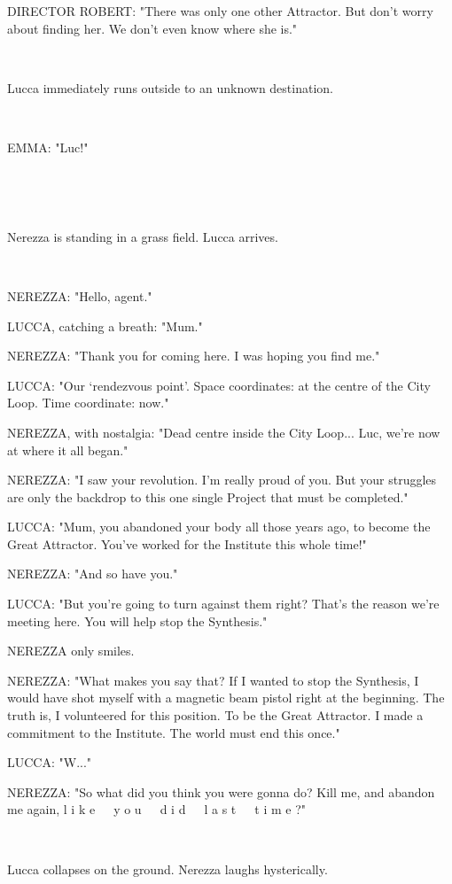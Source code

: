 \documentclass[11pt]{article}
\begin{document}
DIRECTOR ROBERT: "There was only one other Attractor. 
But don't worry about finding her. 
We don't even know where she is."

\ 

Lucca immediately runs outside to an unknown destination.

\ 

EMMA: "Luc!"

\ 

\ 

Nerezza is standing in a grass field.
Lucca arrives. 

\ 

NEREZZA: "Hello, agent."

LUCCA, catching a breath: "Mum."

NEREZZA: "Thank you for coming here. 
I was hoping you find me."

LUCCA: "Our `rendezvous point'.
Space coordinates: at the centre of the City Loop. 
Time coordinate: now."

NEREZZA, with nostalgia: "Dead centre inside the City Loop...
Luc, we're now at where it all began."

NEREZZA: "I saw your revolution. 
I'm really proud of you.
But your struggles are only the backdrop to this one single Project that must be completed."

LUCCA: "Mum, you abandoned your body all those years ago, to become the Great Attractor.
You've worked for the Institute this whole time!"

NEREZZA: "And so have you."

LUCCA: "But you're going to turn against them right?
That's the reason we're meeting here.
You will help stop the Synthesis."

NEREZZA only smiles.

NEREZZA: "What makes you say that?
If I wanted to stop the Synthesis, I would have shot myself with a magnetic beam pistol right at the beginning.
The truth is, I volunteered for this position.
To be the Great Attractor.
I made a commitment to the Institute.
The world must end this once."

LUCCA: "W..."

NEREZZA: "So what did you think you were gonna do?
Kill me, and abandon me again, 
l i k e\ \ \ y o u\ \ \ d i d\ \ \ l a s t\ \ \ t i m e ?"

\ 

Lucca collapses on the ground. 
Nerezza laughs hysterically.

\ 
\end{document}
